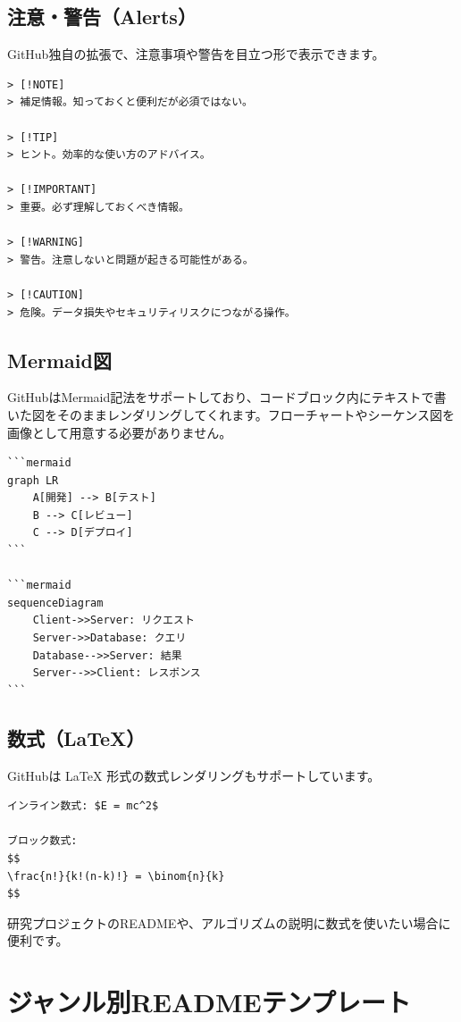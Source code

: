 \subsection{注意・警告（Alerts）}

GitHub独自の拡張で、注意事項や警告を目立つ形で表示できます。

\begin{lstlisting}[language={}]
> [!NOTE]
> 補足情報。知っておくと便利だが必須ではない。

> [!TIP]
> ヒント。効率的な使い方のアドバイス。

> [!IMPORTANT]
> 重要。必ず理解しておくべき情報。

> [!WARNING]
> 警告。注意しないと問題が起きる可能性がある。

> [!CAUTION]
> 危険。データ損失やセキュリティリスクにつながる操作。
\end{lstlisting}

\subsection{Mermaid図}

GitHubはMermaid記法をサポートしており、コードブロック内にテキストで書いた図をそのままレンダリングしてくれます。フローチャートやシーケンス図を画像として用意する必要がありません。

\begin{lstlisting}[language={}]
```mermaid
graph LR
    A[開発] --> B[テスト]
    B --> C[レビュー]
    C --> D[デプロイ]
```

```mermaid
sequenceDiagram
    Client->>Server: リクエスト
    Server->>Database: クエリ
    Database-->>Server: 結果
    Server-->>Client: レスポンス
```
\end{lstlisting}

\subsection{数式（LaTeX）}

GitHubは LaTeX 形式の数式レンダリングもサポートしています。

\begin{lstlisting}[language={}]
インライン数式: $E = mc^2$

ブロック数式:
$$
\frac{n!}{k!(n-k)!} = \binom{n}{k}
$$
\end{lstlisting}

研究プロジェクトのREADMEや、アルゴリズムの説明に数式を使いたい場合に便利です。

\section{ジャンル別READMEテンプレート}

